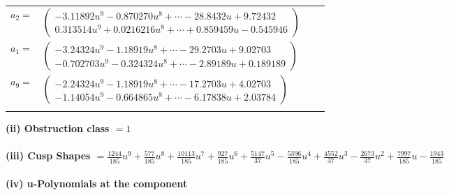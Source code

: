 \documentclass[1p]{elsarticle_modified}
\theoremstyle{definition}
\begin{document}
\begin{tabular}{m{7pt} m{180pt} m{7pt} m{180pt} }
\flushright $a_{2}=$&$\begin{pmatrix}-3.11892 u^{9}-0.870270 u^{8}+\cdots-28.8432 u+9.72432\\0.313514 u^{9}+0.0216216 u^{8}+\cdots+0.859459 u-0.545946\end{pmatrix}$ \\
\flushright $a_{1}=$&$\begin{pmatrix}-3.24324 u^{9}-1.18919 u^{8}+\cdots-29.2703 u+9.02703\\-0.702703 u^{9}-0.324324 u^{8}+\cdots-2.89189 u+0.189189\end{pmatrix}$ \\
\flushright $a_{9}=$&$\begin{pmatrix}-2.24324 u^{9}-1.18919 u^{8}+\cdots-17.2703 u+4.02703\\-1.14054 u^{9}-0.664865 u^{8}+\cdots-6.17838 u+2.03784\end{pmatrix}$\\&\end{tabular}
\flushleft \textbf{(ii) Obstruction class $= 1$}\\~\\
\flushleft \textbf{(iii) Cusp Shapes $= \frac{1244}{185} u^9+\frac{577}{185} u^8+\frac{10113}{185} u^7+\frac{927}{185} u^6+\frac{5147}{37} u^5-\frac{5396}{185} u^4+\frac{4552}{37} u^3-\frac{2673}{37} u^2+\frac{7997}{185} u-\frac{1943}{185}$}\\~\\
\newpage\renewcommand{\arraystretch}{1}
\flushleft \textbf{(iv) u-Polynomials at the component}\newline \\
\end{document}
